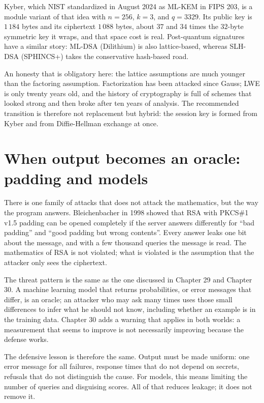 Kyber, which NIST standardized in August 2024 as ML-KEM in FIPS 203, is a module variant of that idea
with $n=256$, $k=3$, and $q=3329$. Its public key is $1\,184$ bytes and its ciphertext $1\,088$
bytes, about $37$ and $34$ times the $32$-byte symmetric key it wraps, and that space cost is real.
Post-quantum signatures have a similar story: ML-DSA (Dilithium) is also lattice-based, whereas
SLH-DSA (SPHINCS+) takes the conservative hash-based road.

An honesty that is obligatory here: the lattice assumptions are much younger than the factoring
assumption. Factorization has been attacked since Gauss; LWE is only twenty years old, and the
history of cryptography is full of schemes that looked strong and then broke after ten years of
analysis. The recommended transition is therefore not replacement but hybrid: the session key is
formed from Kyber and from Diffie-Hellman exchange at once.

\section{When output becomes an oracle: padding and models}

There is one family of attacks that does not attack the mathematics, but the way the program answers.
Bleichenbacher in 1998 showed that RSA with PKCS\#1 v1.5 padding can be opened completely if the
server answers differently for ``bad padding'' and ``good padding but wrong contents''. Every answer
leaks one bit about the message, and with a few thousand queries the message is read. The mathematics
of RSA is not violated; what is violated is the assumption that the attacker only sees the
ciphertext.

The threat pattern is the same as the one discussed in Chapter 29 and Chapter 30. A machine learning
model that returns probabilities, or error messages that differ, is an oracle; an attacker who may
ask many times uses those small differences to infer what he should not know, including whether an
example is in the training data. Chapter 30 adds a warning that applies in both worlds: a measurement
that seems to improve is not necessarily improving because the defense works.

The defensive lesson is therefore the same. Output must be made uniform: one error message for all
failures, response times that do not depend on secrets, refusals that do not distinguish the cause.
For models, this means limiting the number of queries and disguising scores. All of that reduces
leakage; it does not remove it.


